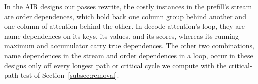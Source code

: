 In the AIR designs our passes rewrite, the costly instances in the prefill's stream are order dependences, which hold back one column group behind another and one column of attention behind the other.
In decode attention's loop, they are name dependences on its keys, its values, and its scores, whereas its running maximum and accumulator carry true dependences.
The other two combinations, name dependences in the stream and order dependences in a loop, occur in these designs only off every longest path or critical cycle we compute with the critical-path test of Section~\ref{subsec:removal}.

